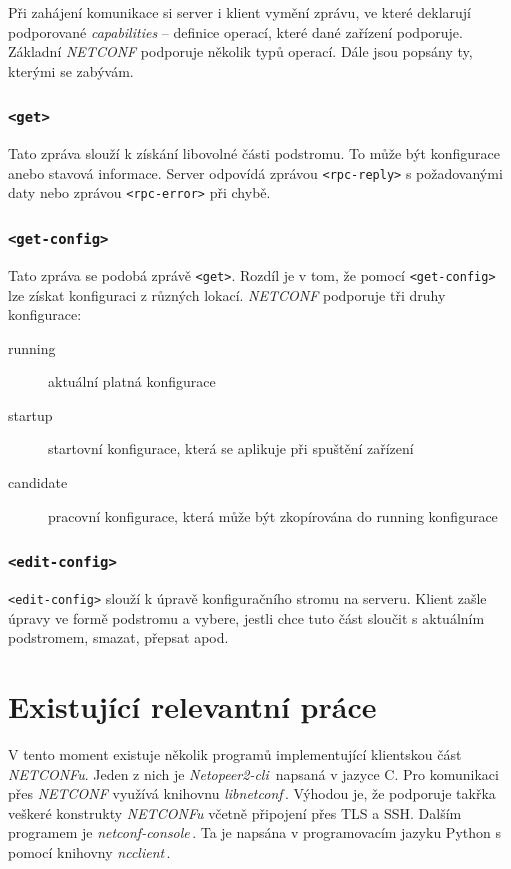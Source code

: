 \documentclass[thesis=B,czech,hidelinks]{FITthesis}[2019/03/06]
\begin{document}
Při zahájení komunikace si server i klient vymění  zprávu, ve které deklarují podporované \textit{capabilities} -- definice operací, které dané zařízení podporuje. Základní \textit{NETCONF} podporuje několik typů operací. Dále jsou popsány ty, kterými se zabývám.

\subsection{\texttt{<get>}}
Tato zpráva slouží k získání libovolné části podstromu. To může být konfigurace anebo stavová informace. Server odpovídá zprávou \texttt{<rpc-reply>} s požadovanými daty nebo zprávou \texttt{<rpc-error>} při chybě.

\subsection{\texttt{<get-config>}}
Tato zpráva se podobá zprávě \texttt{<get>}. Rozdíl je v tom, že pomocí \texttt{<get-config>} lze získat konfiguraci z různých lokací. \textit{NETCONF} podporuje tři druhy konfigurace:
\begin{description}
    \item[running]{aktuální platná konfigurace}
    \item[startup]{startovní konfigurace, která se aplikuje při spuštění zařízení}
    \item[candidate]{pracovní konfigurace, která může být zkopírována do running konfigurace}
\end{description}

\subsection{\texttt{<edit-config>}}
\texttt{<edit-config>} slouží k úpravě konfiguračního stromu na serveru. Klient zašle úpravy ve formě podstromu a vybere, jestli chce tuto část sloučit s aktuálním podstromem, smazat, přepsat apod.


\chapter{Existující relevantní práce}
V tento moment existuje několik programů implementující klientskou část \textit{NETCONFu}. Jeden z nich je \textit{Netopeer2-cli}\,\cite{netopeer} napsaná v jazyce C. Pro komunikaci přes \textit{NETCONF} využívá knihovnu \textit{libnetconf}\,\cite{libnetconf}. Výhodou je, že podporuje takřka veškeré konstrukty \textit{NETCONFu} včetně připojení přes TLS a SSH\@. Dalším programem je \textit{netconf-console}\,\cite{netconf-console}. Ta je napsána v programovacím jazyku Python s pomocí knihovny \textit{ncclient}\,\cite{ncclient}.
\end{document}
